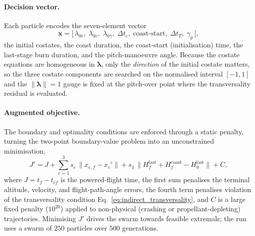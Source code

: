 \paragraph{Decision vector.}
Each particle encodes the seven-element vector
\begin{equation}
  \mathbf{x} = \bigl[\,\lambda_{0r},\;\lambda_{0v},\;\lambda_{0\gamma},\;
        \Delta t_c,\; \text{coast-start},\; \Delta t_T,\; \gamma_p\,\bigr],
  \label{eq:indirect_vector}
\end{equation}
the initial costates, the coast duration, the coast-start (initialisation) time,
the last-stage burn duration, and the pitch-manoeuvre angle. Because the costate
equations are homogeneous in $\boldsymbol\lambda$, only the \emph{direction} of
the initial costate matters, so the three costate components are searched on the
normalised interval $[-1,1]$ and the $\lVert\boldsymbol\lambda\rVert=1$ gauge is
fixed at the pitch-over point where the transversality residual is evaluated.

\paragraph{Augmented objective.}
The boundary and optimality conditions are enforced through a static penalty,
turning the two-point boundary-value problem into an unconstrained minimisation,
\begin{equation}
  J' = J + \sum_{c=1}^{3} s_c\,\bigl\lVert x_{c,f}-x_c'\bigr\rVert
     + s_4\,\bigl\lVert H_f^{\mathrm{last}} + H_f^{\mathrm{coast}}
                      - H_0^{\mathrm{last}}\bigr\rVert + C,
  \label{eq:indirect_augmented}
\end{equation}
where $J=t_f-t_{cf}$ is the powered-flight time, the first sum penalises the
terminal altitude, velocity, and flight-path-angle errors, the fourth term
penalises violation of the transversality condition
Eq.~\eqref{eq:indirect_transversality}, and $C$ is a large fixed penalty
($10^{20}$) applied to non-physical (crashing or propellant-depleting)
trajectories. Minimising $J'$ drives the swarm towards feasible extremals; the
run uses a swarm of $250$ particles over $500$ generations.

